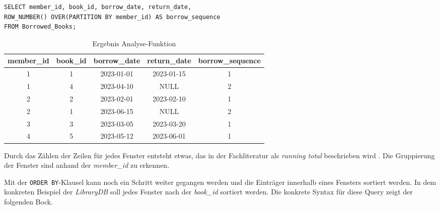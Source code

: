 \begin{lstlisting}
SELECT member_id, book_id, borrow_date, return_date,
ROW_NUMBER() OVER(PARTITION BY member_id) AS borrow_sequence
FROM Borrowed_Books;
\end{lstlisting}
\begin{table}[h]
	\centering
	\begin{tabular}{|c|c|c|c|c|}
		\hline
		\textbf{member\_id} & \textbf{book\_id} & \textbf{borrow\_date} & \textbf{return\_date} & \textbf{borrow\_sequence} \\
		\hline
		1                   & 1                 & 2023-01-01            & 2023-01-15            & 1                         \\
		\hline
		1                   & 4                 & 2023-04-10            & NULL                  & 2                         \\
		\hline
		2                   & 2                 & 2023-02-01            & 2023-02-10            & 1                         \\
		\hline
		2                   & 1                 & 2023-06-15            & NULL                  & 2                         \\
		\hline
		3                   & 3                 & 2023-03-05            & 2023-03-20            & 1                         \\
		\hline
		4                   & 5                 & 2023-05-12            & 2023-06-01            & 1                         \\
		\hline
	\end{tabular}
	\caption{Ergebnis Analyse-Funktion}
	\label{tab:ergebnnis_analyse_funktion}
\end{table}

Durch das Zählen der Zeilen für jedes Fenster entsteht etwas, das in der
Fachliteratur als \textit{running total} beschrieben wird \citep[vgl.][S. 37]{Nuijten2023}.
Die Gruppierung der Fenster sind anhand der \textit{member\_id} zu erkennen.

Mit der \texttt{ORDER BY}-Klausel kann noch ein Schritt weiter gegangen werden und
die Einträger innerhalb eines Fensters sortiert werden. In dem konkreten
Beispiel der \textit{LibraryDB} soll jedes Fenster nach der \textit{book\_id}
sortiert werden. Die konkrete Syntax für diese Query zeigt der folgenden Bock.

